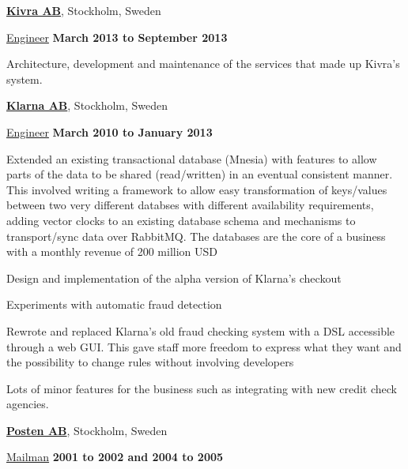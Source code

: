 \documentclass[10pt]{article}
\renewcommand\textit[1]{\underline{#1}}
\newcommand{\halfblankline}{\quad\vspace{-0.5\baselineskip}\pagebreak[3]}
\begin{document}
\halfblankline

\href{http://www.kivra.se/}{\textbf{Kivra AB}},
Stockholm, Sweden
\begin{outerlist}
\item[] \textit{Engineer}
  \hfill \textbf{March 2013 to September 2013}
  \begin{innerlist}
    \item
      Architecture, development and maintenance of the services that made up
      Kivra's system.
  \end{innerlist}
\end{outerlist}

\halfblankline

\href{http://www.klarna.com/}{\textbf{Klarna AB}},
Stockholm, Sweden
\begin{outerlist}
\item[] \textit{Engineer}%
  \hfill \textbf{March 2010 to January 2013}
  \begin{innerlist}
  \item
    Extended an existing transactional database (Mnesia)
    with features to allow parts of the data to be shared (read/written)
    in an eventual consistent manner.
    This involved writing a framework to allow easy transformation
    of keys/values between two very different databses with different
    availability requirements, adding vector clocks to an existing database
    schema and mechanisms to transport/sync data over RabbitMQ.
    The databases are the core of a business with a monthly revenue of
    200 million USD
  \item
    Design and implementation of the alpha version of Klarna's checkout
  \item
    Experiments with automatic fraud detection
  \item
    Rewrote and replaced Klarna's old fraud checking system with a DSL
    accessible through a web GUI.
    This gave staff more freedom to express what they want and the
    possibility to change rules without involving developers
  \item
    Lots of minor features for the business such as integrating with new
    credit check agencies.
  \end{innerlist}
\end{outerlist}

\halfblankline

\href{http://www.posten.se/}{\textbf{Posten AB}},
Stockholm, Sweden
\begin{outerlist}
\item[] \textit{Mailman}%
  \hfill \textbf{2001 to 2002 and 2004 to 2005}
\end{outerlist}
\end{document}
